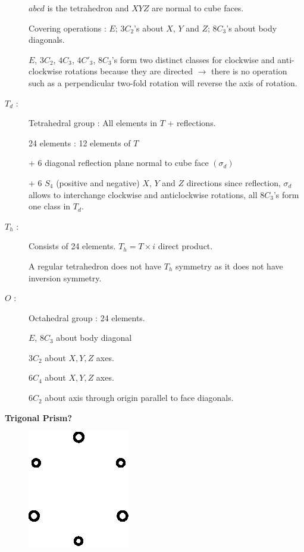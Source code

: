 \begin{description}
\begin{center}
\begin{minipage}[c]{6.2cm}
\begin{figure}[H]
\end{figure}
\end{minipage}
\end{center}
$abcd$ is the tetrahedron and $XYZ$ are normal to cube faces.

Covering operations : $E$; $3C_{2}$'s about $X$, $Y$ and $Z$; $8C_{3}$'s about body diagonals.

$E$, $3C_{2}$, $4C_{3}$, $4C'_{3}$, $8C_{3}$'s form two distinct classes for clock\-wise and anti-clock\-wise rotations because they are directed $\to$ there is no operation such as a perpendicular two-fold rotation will reverse the axis of rotation.

\item[$T_{d}$ :] Tetrahedral group : All elements in $T$ + reflections.

24 elements : 12 elements of $T$

+ 6 diagonal reflection plane normal to cube face $(\sigma_{d})$

+ 6 $S_{4}$ (positive and negative) $X$, $Y$ and $Z$ directions since reflection, $\sigma_{d}$ allows to interchange clockwise and anticlockwise rotations, all $8C_{3}$'s form one class in $T_{d}$. 

\item[$T_{h}$ :] Consists of 24 elements. $T_{h}=T\times i$ direct product.

A regular tetrahedron does not have $T_{h}$ symmetry as it does not have inversion symmetry.

\item[$O$ :] Octahedral group : 24 elements.

$E$, $8C_{3}$ about body diagonal

$3C_{2}$ about $X, Y, Z$ axes.

$6C_{4}$ about $X, Y, Z$ axes.

$6C_{2}$ about axis through origin parallel to face diagonals.
\end{description}

\noindent
{\bf Trigonal Prism?}
\begin{figure}[H]
\centering
\includegraphics[scale=.8]{images/lecture11/fig2a.eps}
\end{figure}

